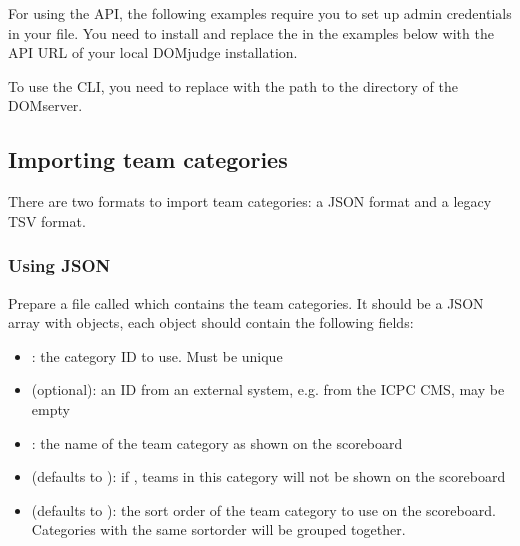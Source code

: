 \documentclass[a4paper,10pt,english,openany]{sphinxmanual}
\begin{document}
\sphinxAtStartPar
For using the API, the following examples require you to set up admin credentials
in your  file. You need to install  and replace the
 in the examples below with the API URL of your local DOMjudge
installation.

\sphinxAtStartPar
To use the CLI, you need to replace  with the path to
the  directory of the DOMserver.


\subsection{Importing team categories}
\label{\detokenize{import:importing-team-categories}}
\sphinxAtStartPar
There are two formats to import team categories: a JSON format and a legacy TSV format.


\subsubsection{Using JSON}
\label{\detokenize{import:using-json}}
\sphinxAtStartPar
Prepare a file called  which contains the team categories.
It should be a JSON array with objects, each object should contain the following
fields:
\begin{itemize}
\item {} 
\sphinxAtStartPar
{}: the category ID to use. Must be unique

\item {} 
\sphinxAtStartPar
{} (optional): an ID from an external system, e.g. from the ICPC CMS, may be empty

\item {} 
\sphinxAtStartPar
{}: the name of the team category as shown on the scoreboard

\item {} 
\sphinxAtStartPar
{} (defaults to ): if , teams in this category will
not be shown on the scoreboard

\item {} 
\sphinxAtStartPar
{} (defaults to ): the sort order of the team category to use
on the scoreboard. Categories with the same sortorder will be grouped together.

\end{itemize}
\end{document}
